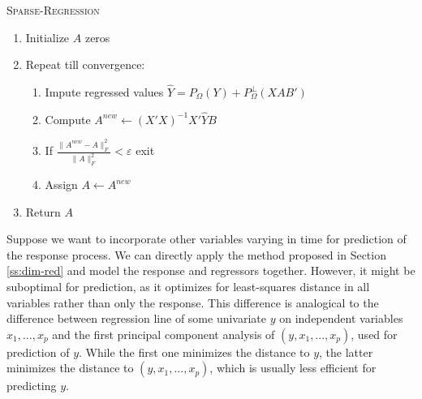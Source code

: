 \documentclass[preprint]{imsart}
\numberwithin{equation}{section}
\theoremstyle{plain}
\begin{document}
\begin{algorithm}
\caption{\textsc{Sparse-Regression}\label{alg:longitudinal-regression}}
\vspace{3pt}
\begin{enumerate}
\item Initialize $A$ zeros
\item Repeat till convergence:
\begin{enumerate}
\item Impute regressed values $\hat{Y} = P_\Omega(Y) + P_\Omega^\perp(XAB')$
\item Compute $A^{new} \leftarrow (X'X)^{-1} X'\hat{Y}B$
\item If $\frac{\|A^{new} - A\|_F^2}{\|A\|_F^2} < \varepsilon$ exit
\item Assign $A \leftarrow A^{new}$
\end{enumerate}
\item Return $A$
\end{enumerate}
\end{algorithm}


Suppose we want to incorporate other variables varying in time for prediction of the response process. We can directly apply the method proposed in Section \ref{ss:dim-red} and model the response and regressors together. However, it might be suboptimal for prediction, as it optimizes for least-squares distance in all variables rather than only the response. This difference is analogical to the difference between regression line of some univariate $y$ on independent variables $x_1,...,x_p$ and the first principal component analysis of $(y,x_1,...,x_p)$, used for prediction of $y$. While the first one minimizes the distance to $y$, the latter minimizes the distance to $(y,x_1,...,x_p)$, which is usually less efficient for predicting $y$.
\end{document}
